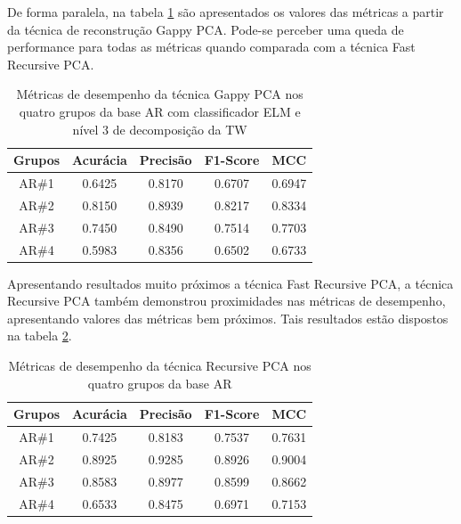 De forma paralela, na tabela \ref{tab:teste_estatistico_gappy_pca} são apresentados os valores das métricas a partir da técnica de reconstrução Gappy PCA. Pode-se perceber uma queda de performance para todas as métricas quando comparada com a técnica Fast Recursive PCA.

\begin{table}[htpb]
    \centering
	\caption{Métricas de desempenho da técnica Gappy PCA nos quatro grupos da base AR com classificador ELM e nível 3 de decomposição da TW}
\begin{tabular}{|c|c|c|c|c|}
\hline
\textbf{Grupos} & \textbf{Acurácia} & \textbf{Precisão} & \textbf{F1-Score} & \textbf{MCC} \\\hline
AR\#1&	0.6425		&0.8170	& 0.6707	&0.6947 \\\hline
AR\#2&	0.8150		&0.8939	& 0.8217	& 0.8334 \\\hline
AR\#3&	0.7450		&0.8490	& 0.7514	&0.7703 \\\hline
AR\#4&	0.5983		&0.8356	& 0.6502	&0.6733 \\\hline
\end{tabular}
\label{tab:teste_estatistico_gappy_pca}
\end{table}

Apresentando resultados muito próximos a técnica Fast Recursive PCA, a técnica Recursive PCA também demonstrou proximidades nas métricas de desempenho, apresentando valores das métricas bem próximos. Tais resultados estão dispostos na tabela \ref{tab:teste_estatistico_recursive_pca}.

\begin{table}[htpb]
    \centering
	\caption{Métricas de desempenho da técnica Recursive PCA nos quatro grupos da base AR}
\begin{tabular}{|c|c|c|c|c|}
\hline
\textbf{Grupos} & \textbf{Acurácia} & \textbf{Precisão} & \textbf{F1-Score} & \textbf{MCC} \\\hline
AR\#1 &	0.7425	 &	0.8183	& 0.7537	& 0.7631 \\\hline
AR\#2 &	0.8925	 &	0.9285	& 0.8926 	& 0.9004 \\\hline
AR\#3 &	0.8583 	 &	0.8977	& 0.8599	& 0.8662 \\\hline
AR\#4 &	0.6533	 &	0.8475	& 0.6971	& 0.7153 \\\hline
 \end{tabular}
\label{tab:teste_estatistico_recursive_pca}
\end{table}


